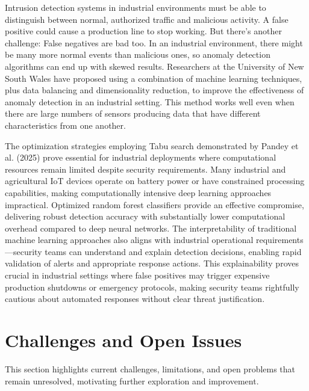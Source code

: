 \documentclass[12pt]{article}
\begin{document}
Intrusion detection systems in industrial environments must be able to distinguish between normal, authorized traffic and malicious activity. A false positive could cause a production line to stop working. But there’s another challenge: False negatives are bad too. In an industrial environment, there might be many more normal events than malicious ones, so anomaly detection algorithms can end up with skewed results. Researchers at the University of New South Wales have proposed using a combination of machine learning techniques, plus data balancing and dimensionality reduction, to improve the effectiveness of anomaly detection in an industrial setting. This method works well even when there are large numbers of sensors producing data that have different characteristics from one another.

The optimization strategies employing Tabu search demonstrated by Pandey et al. (2025) prove essential for industrial deployments where computational resources remain limited despite security requirements. Many industrial and agricultural IoT devices operate on battery power or have constrained processing capabilities, making computationally intensive deep learning approaches impractical. Optimized random forest classifiers provide an effective compromise, delivering robust detection accuracy with substantially lower computational overhead compared to deep neural networks. The interpretability of traditional machine learning approaches also aligns with industrial operational requirements—security teams can understand and explain detection decisions, enabling rapid validation of alerts and appropriate response actions. This explainability proves crucial in industrial settings where false positives may trigger expensive production shutdowns or emergency protocols, making security teams rightfully cautious about automated responses without clear threat justification.
	\section{Challenges and Open Issues}
	This section highlights current challenges, limitations, and open problems that remain unresolved, motivating further exploration and improvement.
\end{document}
